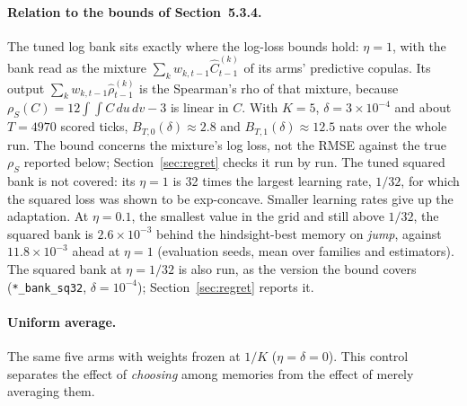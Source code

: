 \paragraph{Relation to the bounds of Section~5.3.4.} The tuned log bank sits exactly where the
log-loss bounds hold: $\eta=1$, with the bank read as the mixture $\sum_k w_{k,t-1}\hat C^{(k)}_{t-1}$
of its arms' predictive copulas. Its output $\sum_k w_{k,t-1}\hat\rho^{(k)}_{t-1}$ is the Spearman's
rho of that mixture, because $\rho_S(C)=12\int\!\!\int C\,du\,dv-3$ is linear in $C$. With $K=5$,
$\delta=3\times10^{-4}$ and about $T=4970$ scored ticks, $B_{T,0}(\delta)\approx2.8$ and
$B_{T,1}(\delta)\approx12.5$ nats over the whole run. The bound concerns the mixture's log loss, not
the RMSE against the true $\rho_S$ reported below; Section~\ref{sec:regret} checks it run by run.
The tuned squared bank is not covered: its
$\eta=1$ is 32 times the largest learning rate, $1/32$, for which the squared loss was shown to be
exp-concave. Smaller learning rates give up the adaptation. At $\eta=0.1$, the smallest value in
the grid and still above $1/32$, the squared bank is $2.6\times10^{-3}$ behind the hindsight-best
memory on \emph{jump}, against $11.8\times10^{-3}$ ahead at $\eta=1$ (evaluation seeds, mean over
families and estimators).
The squared bank at $\eta=1/32$ is also run, as the version the bound covers
(\texttt{*\_bank\_sq32}, $\delta=10^{-4}$); Section~\ref{sec:regret} reports it.

\paragraph{Uniform average.} The same five arms with weights frozen at $1/K$ ($\eta=\delta=0$).
This control separates the effect of \emph{choosing} among memories from the effect of merely
averaging them.

